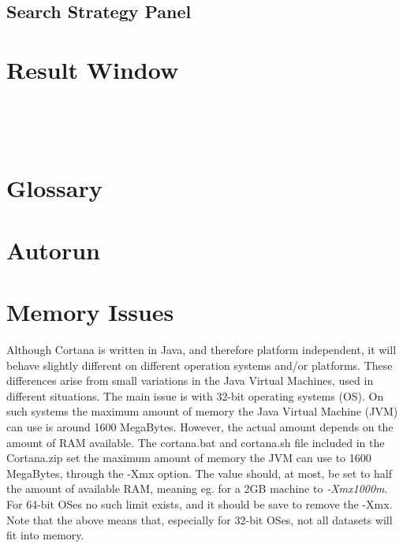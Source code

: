 \documentclass{article}
\begin{document}
\subsection{Search Strategy Panel}
\label{sec:searchstrategy}

\section{Result Window}

\appendix
\clearpage
~\vfill


\vfill~
\clearpage

\section{Glossary}
\vspace{-10mm}
\renewcommand*{\glossaryname}{}
\printglossaries

\section{Autorun}

\section{Memory Issues}
\label{sec:memory}

Although Cortana is written in Java, and therefore platform independent, it will behave slightly different on different operation systems and/or platforms.
These differences arise from small variations in the Java Virtual Machines, used in different situations.
The main issue is with 32-bit operating systems (OS).
On such systems the maximum amount of memory the Java Virtual Machine (JVM) can use is around 1600 MegaBytes.
However, the actual amount depends on the amount of RAM available.
The cortana.bat and cortana.sh file included in the Cortana.zip set the maximum amount of memory the JVM can use to 1600 MegaBytes, through the -Xmx option.
The value should, at most, be set to half the amount of available RAM, meaning eg. for a 2GB machine to \emph{-Xmx1000m}.
For 64-bit OSes no such limit exists, and it should be save to remove the -Xmx.
Note that the above means that, especially for 32-bit OSes, not all datasets will fit into memory.
\end{document}
